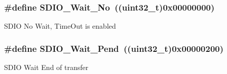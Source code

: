 \subsubsection[{S\+D\+I\+O\+\_\+\+Wait\+\_\+\+No}]{\setlength{\rightskip}{0pt plus 5cm}\#define S\+D\+I\+O\+\_\+\+Wait\+\_\+\+No~((uint32\+\_\+t)0x00000000)}\label{group___s_d_i_o___wait___interrupt___state_ga266294e1ffd7a4b45e62bff753ca44b2}
S\+D\+I\+O No Wait, Time\+Out is enabled \hypertarget{group___s_d_i_o___wait___interrupt___state_ga2a4104023a7f8403ddd159ec3bbb8592}{}
\subsubsection[{S\+D\+I\+O\+\_\+\+Wait\+\_\+\+Pend}]{\setlength{\rightskip}{0pt plus 5cm}\#define S\+D\+I\+O\+\_\+\+Wait\+\_\+\+Pend~((uint32\+\_\+t)0x00000200)}\label{group___s_d_i_o___wait___interrupt___state_ga2a4104023a7f8403ddd159ec3bbb8592}
S\+D\+I\+O Wait End of transfer 